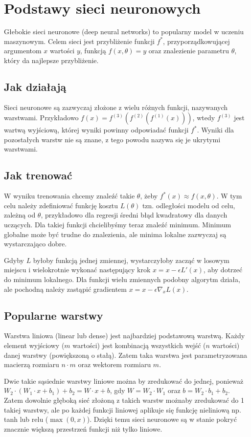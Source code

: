 \section{Podstawy sieci neuronowych}
Głebokie sieci neuronowe (deep neural networks) to popularny model w uczeniu maszynowym.
Celem sieci jest przybliżenie funkcji $f^*$, przyporządkowującej argumentom $x$ wartości
$y$, funkcją $f(x,\theta)=y$ oraz znalezienie parametru $\theta$, który da najlepsze
przybliżenie.
\subsection{Jak działają}
Sieci neuronowe są zazwyczaj złożone z wielu różnych funkcji, nazywanych warstwami. Przykładowo
$f(x)=f^{(3)}(f^{(2)}(f^{(1)}(x)))$, wtedy $f^{(3)}$ jest wartwą wyjściową, której wyniki
powinny odpowiadać funkcji $f^*$. Wyniki dla pozostałych warstw nie są znane, z tego
powodu nazywa się je ukrytymi warstwami.
\subsection{Jak trenować}
W wyniku trenowania chcemy znaleźć takie $\theta$, żeby $f^*(x)\approx f(x,\theta)$.
W tym celu należy zdefiniować funkcję kosztu $L(\theta)$ tzn. odległości modelu 
od celu, zależną od $\theta $,
przykładowo dla regresji średni błąd kwadratowy dla danych uczących. Dla takiej
funkcji chcielibyśmy teraz znaleźć minimum. Minimum globalne może być trudne
do znalezienia, ale minima lokalne zazwyczaj są wystarczająco dobre.

Gdyby $L$ byłoby funkcją jednej zmiennej, wystarczyłoby zacząć w losowym miejscu i
wielokrotnie wykonać następujący
krok $x=x-\epsilon L'(x)$, aby dotrzeć do minimum lokalnego. Dla funkcji
wielu zmiennych podobny algorytm działa, ale pochodną należy zastąpić gradientem
$x=x-\epsilon \nabla _x L(x)$.
\subsection{Popularne warstwy}
Warstwa liniowa (linear lub dense) jest najbardziej podstawową warstwą. Każdy 
element wyjściowy ($m$ wartości) jest kombinacją wszystkich wejść ($n$ wartości)
danej warstwy (powiększoną o stałą). Zatem taka warstwa jest parametryzowana
macierzą rozmiaru $n \cdot m$ oraz wektorem rozmiaru $m$.

Dwie takie sąsiednie warstwy liniowe można by zredukować do jednej, ponieważ
$W_2 \cdot (W_1 \cdot x + b_1) +b_2 = W \cdot x + b$, gdy $W=W_2 \cdot W_1$ oraz
$b = W_2 \cdot b_1 +b_2$. Zatem dowolnie głęboką sieć złożoną z takich warstw
możnaby zredukować do 1 takiej warstwy, ale po każdej funkcji liniowej aplikuje
się funkcję nieliniową np. tanh lub relu ($\max(0,x)$). Dzięki temu sieci neuronowe
są w stanie pokryć znacznie większą przestrzeń funkcji niż tylko liniowe.

